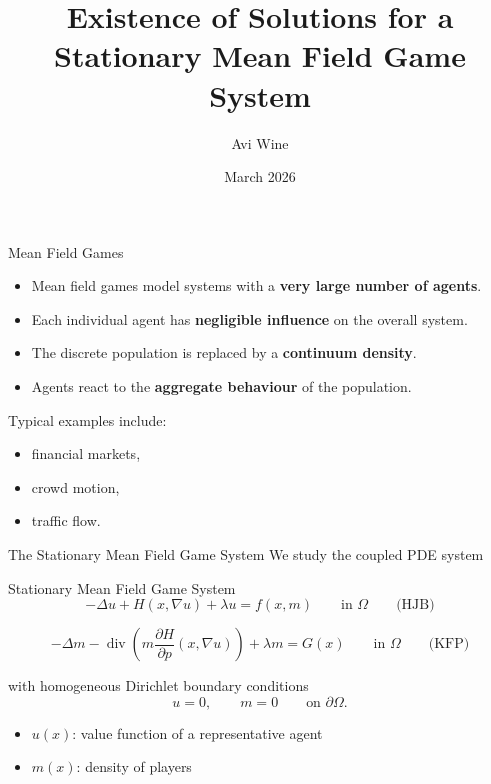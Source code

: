 \documentclass[aspectratio=169]{beamer}
\title{Existence of Solutions for a Stationary Mean Field Game System}
\author{Avi Wine}
\date{March 2026}
\begin{document}
\begin{frame}
  \titlepage
\end{frame}

\begin{frame}{Mean Field Games}
\begin{itemize}
    \item Mean field games model systems with a \textbf{very large number of agents}.
    \item Each individual agent has \textbf{negligible influence} on the overall system.
    \item The discrete population is replaced by a \textbf{continuum density}.
    \item Agents react to the \textbf{aggregate behaviour} of the population.
\end{itemize}

\vspace{0.4cm}

Typical examples include:
\begin{itemize}
    \item financial markets,
    \item crowd motion,
    \item traffic flow.
\end{itemize}
\end{frame}

\begin{frame}{The Stationary Mean Field Game System}
We study the coupled PDE system
\begin{block}{Stationary Mean Field Game System}
\[
-\Delta u + H(x,\nabla u) + \lambda u = f(x,m)
\qquad \text{in } \Omega \qquad \text{(HJB)}
\]

\[
-\Delta m - \operatorname{div}\!\left(m \frac{\partial H}{\partial p}(x,\nabla u)\right) + \lambda m = G(x)
\qquad \text{in } \Omega \qquad \text{(KFP)}
\]
\end{block}
with homogeneous Dirichlet boundary conditions
\[
u = 0, \qquad m = 0 \qquad \text{on } \partial \Omega.
\]

\vspace{0.3cm}

\begin{itemize}
    \item \(u(x)\): value function of a representative agent
    \item \(m(x)\): density of players
\end{itemize}
\end{frame}
\end{document}
